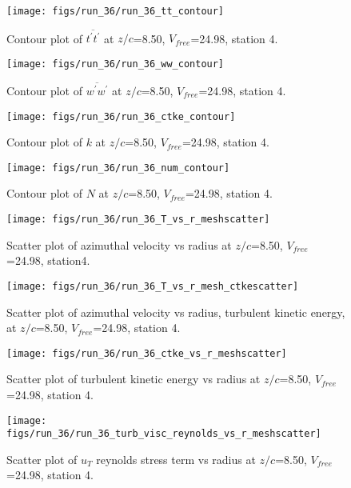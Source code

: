 \begin{figure}[H]
\centering
\texttt{[image: figs/run\_36/run\_36\_tt\_contour]}
\caption{Contour plot of $\overline{t^\prime t^\prime}$ at $z/c$=8.50, $V_{free}$=24.98, station 4.}
\end{figure}


\begin{figure}[H]
\centering
\texttt{[image: figs/run\_36/run\_36\_ww\_contour]}
\caption{Contour plot of $\overline{w^\prime w^\prime}$ at $z/c$=8.50, $V_{free}$=24.98, station 4.}
\end{figure}


\begin{figure}[H]
\centering
\texttt{[image: figs/run\_36/run\_36\_ctke\_contour]}
\caption{Contour plot of $k$ at $z/c$=8.50, $V_{free}$=24.98, station 4.}
\end{figure}


\begin{figure}[H]
\centering
\texttt{[image: figs/run\_36/run\_36\_num\_contour]}
\caption{Contour plot of $N$ at $z/c$=8.50, $V_{free}$=24.98, station 4.}
\end{figure}


\begin{figure}[H]
\centering
\texttt{[image: figs/run\_36/run\_36\_T\_vs\_r\_meshscatter]}
\caption{Scatter plot of azimuthal velocity vs radius at $z/c$=8.50, $V_{free}$=24.98, station4.}
\end{figure}


\begin{figure}[H]
\centering
\texttt{[image: figs/run\_36/run\_36\_T\_vs\_r\_mesh\_ctkescatter]}
\caption{Scatter plot of azimuthal velocity vs radius, turbulent kinetic energy, at $z/c$=8.50, $V_{free}$=24.98, station 4.}
\end{figure}


\begin{figure}[H]
\centering
\texttt{[image: figs/run\_36/run\_36\_ctke\_vs\_r\_meshscatter]}
\caption{Scatter plot of turbulent kinetic energy vs radius at $z/c$=8.50, $V_{free}$=24.98, station 4.}
\end{figure}


\begin{figure}[H]
\centering
\texttt{[image: figs/run\_36/run\_36\_turb\_visc\_reynolds\_vs\_r\_meshscatter]}
\caption{Scatter plot of $
u_T$ reynolds stress term vs radius at $z/c$=8.50, $V_{free}$=24.98, station 4.}
\end{figure}


